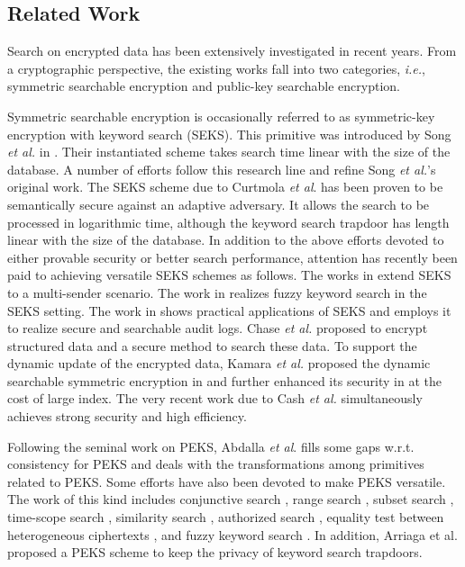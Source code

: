 \documentclass[10pt,twocolumn,twoside]{IEEEtran}
\begin{document}
\subsection{Related Work}

Search on encrypted data has been extensively investigated in recent years. From a cryptographic perspective, the
existing works fall into two categories, {\em i.e.}, symmetric searchable encryption \cite{CGK06} and public-key
searchable encryption.

Symmetric searchable encryption is occasionally referred to as symmetric-key encryption with keyword search (SEKS).
This primitive was introduced by Song \emph{et al.} in \cite{SWP00}. Their instantiated scheme takes search time linear with the size of the database. A number of efforts \cite{G03,BC04,AKSX04,CM05,BCLN09} follow this research line and
refine Song \emph{et al.}'s original work. The SEKS scheme due to Curtmola \emph{et al}. \cite{CGK06} has been proven to be semantically secure against an
adaptive adversary. It allows the search to be processed in logarithmic time, although the keyword search trapdoor has
length linear with the size of the database. In addition to the above efforts devoted to either provable security or
better search performance, attention has recently been paid to achieving versatile SEKS schemes as follows. The works
in \cite{CGK06,BDDY08} extend SEKS to a multi-sender scenario. The work in \cite{LWWCRL10} realizes fuzzy keyword
search in the SEKS setting. The work in \cite{WBDS04} shows practical applications of SEKS and employs it to realize
secure and searchable audit logs. Chase \emph{et al.} \cite{CK10} proposed to encrypt structured data and a secure method to search these data. To support the dynamic update of the encrypted data, Kamara \emph{et al.}  proposed the dynamic searchable symmetric encryption in \cite{KPR12} and further enhanced its security in \cite{KP13} at the cost of large index. The very recent work \cite{CJJJKRS14} due to Cash \emph{et al.} simultaneously achieves strong security and high efficiency.

Following the seminal work on PEKS, Abdalla\emph{ et al}. \cite{ABC05} fills some gaps w.r.t. consistency for PEKS
and deals with the transformations among primitives related to PEKS. Some efforts have also
been devoted to make PEKS versatile. The work of this kind includes conjunctive search
\cite{PKL04,GSW04,BKM05,HL07,RT07,BSS08}, range search \cite{BCP06,SBC07,BW07}, subset search \cite{BW07}, time-scope search \cite{ABC05,DMR04}, similarity search \cite{CMWYZ10}, authorized search \cite{TC11,INH11}, equality test between heterogeneous ciphertexts \cite{YTHW10}, and fuzzy keyword search \cite{XHW13}. In addition, Arriaga et al. \cite{ATR14} proposed a PEKS scheme to keep the privacy of keyword search trapdoors.
\end{document}
